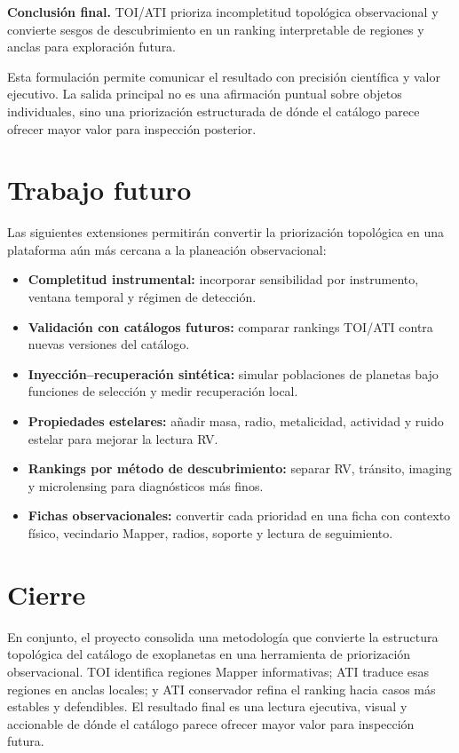 \documentclass[11pt,letterpaper]{article}
\begin{document}
\begin{keybox}
\textbf{Conclusión final.} TOI/ATI prioriza incompletitud topológica observacional y convierte sesgos de descubrimiento en un ranking interpretable de regiones y anclas para exploración futura.
\end{keybox}

Esta formulación permite comunicar el resultado con precisión científica y valor ejecutivo. La salida principal no es una afirmación puntual sobre objetos individuales, sino una priorización estructurada de dónde el catálogo parece ofrecer mayor valor para inspección posterior.

\section{Trabajo futuro}

Las siguientes extensiones permitirán convertir la priorización topológica en una plataforma aún más cercana a la planeación observacional:

\begin{itemize}[leftmargin=1.4em]
    \item \textbf{Completitud instrumental:} incorporar sensibilidad por instrumento, ventana temporal y régimen de detección.
    \item \textbf{Validación con catálogos futuros:} comparar rankings TOI/ATI contra nuevas versiones del catálogo.
    \item \textbf{Inyección--recuperación sintética:} simular poblaciones de planetas bajo funciones de selección y medir recuperación local.
    \item \textbf{Propiedades estelares:} añadir masa, radio, metalicidad, actividad y ruido estelar para mejorar la lectura RV.
    \item \textbf{Rankings por método de descubrimiento:} separar RV, tránsito, imaging y microlensing para diagnósticos más finos.
    \item \textbf{Fichas observacionales:} convertir cada prioridad en una ficha con contexto físico, vecindario Mapper, radios, soporte y lectura de seguimiento.
\end{itemize}

\section*{Cierre}

En conjunto, el proyecto consolida una metodología que convierte la estructura topológica del catálogo de exoplanetas en una herramienta de priorización observacional. TOI identifica regiones Mapper informativas; ATI traduce esas regiones en anclas locales; y ATI conservador refina el ranking hacia casos más estables y defendibles. El resultado final es una lectura ejecutiva, visual y accionable de dónde el catálogo parece ofrecer mayor valor para inspección futura.
\end{document}
